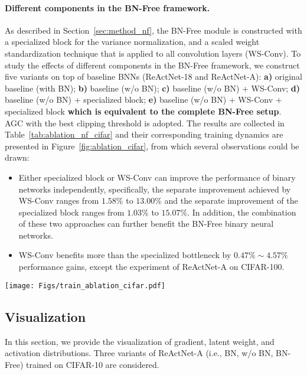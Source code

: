 \documentclass[final]{cvpr}
\begin{document}
\paragraph{Different components in the BN-Free framework.} As described in Section~\ref{sec:method_nf}, the BN-Free module is constructed with a specialized block for the variance normalization, and a scaled weight standardization technique that is applied to all convolution layers (WS-Conv). To study the effects of different components in the BN-Free framework, we construct five variants on top of baseline BNNs (ReActNet-18 and ReActNet-A): \textbf{a)} original baseline (with BN); \textbf{b)} baseline (w/o BN); \textbf{c)} baseline (w/o BN) + WS-Conv; \textbf{d)} baseline (w/o BN) + specialized block; \textbf{e)} baseline (w/o BN) + WS-Conv + specialized block \textbf{which is equivalent to the complete BN-Free setup}. AGC with the best clipping threshold is adopted. The results are collected in Table~\ref{tab:ablation_nf_cifar} and their corresponding training dynamics are presented in Figure~\ref{fig:ablation_cifar}, from which several observations could be drawn:
\begin{itemize}
    \item Either specialized block or WS-Conv can improve the performance of binary networks independently, specifically, the separate improvement achieved by WS-Conv ranges from $1.58\%$ to $13.00\%$ and the separate improvement of the specialized block ranges from $1.03\%$ to $15.07\%$. In addition, the combination of these two approaches can further benefit the BN-Free binary neural networks.
    \item WS-Conv benefits more than the specialized bottleneck by $0.47\% \sim 4.57\%$ performance gains, except the experiment of ReActNet-A on CIFAR-100.
\end{itemize}

\begin{figure*}[t]
    \centering
    \texttt{[image: Figs/train\_ablation\_cifar.pdf]}
    \caption{Results of testing accuracy over epochs on CIFAR-10/100 with ReActNet-18/A. The \textcolor{green}{green} background represents the first training step, in which only activations are binarized. And in the \textcolor{orange}{orange} part, both activations and weights are binary. }
    \label{fig:ablation_cifar}
    \vspace{-1mm}
\end{figure*}



\subsection{Visualization}
In this section, we provide the visualization of gradient, latent weight, and activation distributions. Three variants of ReActNet-A (i.e., BN, w/o BN, BN-Free) trained on CIFAR-10 are considered.
\end{document}
